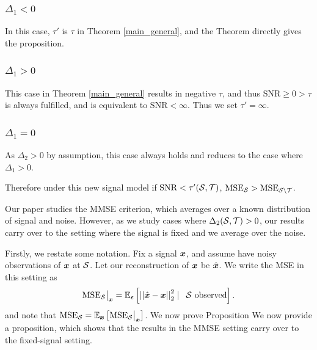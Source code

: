 \subsubsection{$\Delta_{1} < 0$}
In this case, $\tau'$ is $\tau$ in Theorem \ref{main_general}, and the Theorem directly gives the proposition.
\subsubsection{$\Delta_{1} > 0$}
This case in Theorem \ref{main_general} results in negative $\tau$, and thus $\text{SNR} \geq 0 > \tau $ is always fulfilled, and is equivalent to $\text{SNR} < \infty$. Thus we set $\tau' = \infty$.

\subsubsection{$\Delta_{1} = 0$}
As $\Delta_{2} > 0$ by assumption, this case always holds and reduces to the case where $\Delta_{1} > 0$.

Therefore under this new signal model if $\text{SNR} < \tau'(\mathcal{S},\mathcal{T})$, $\text{MSE}_{\mathcal{S}} > \text{MSE}_{\mathcal{S} \backslash \mathcal{T}}$.

\iffalse
Our paper studies the MMSE criterion, which averages over a known distribution of signal and noise. However, as we study cases where $\Delta_{2}(\mathcal{S},\mathcal{T}) > 0$, our results carry over to the setting where the signal is fixed and we average over the noise.

Firstly, we restate some notation. Fix a signal $\bm{x}$, and assume have noisy observations of $\bm{x}$ at $\mathcal{S}$. Let our reconstruction of $\bm{x}$ be $\hat{\bm{x}}$. We write the MSE in this setting as
\begin{equation}
\textrm{MSE}_{\set{S}}\big\vert_{\vect{x}} = \expect[\vect{\epsilon}]{\sqnormvec{\hat{\vect{x}} - \vect{x}} \smallskip \mid \enspace \set{S} \textrm{ observed} }.
\end{equation}
and note that $\text{MSE}_{\set{S}} = \expect[\vect{x}]{\textrm{MSE}_{\set{S}}\big\vert_{\vect{x}}}$.
We now prove Proposition
We now provide a proposition, which shows that the results in the MMSE setting carry over to the fixed-signal setting.

